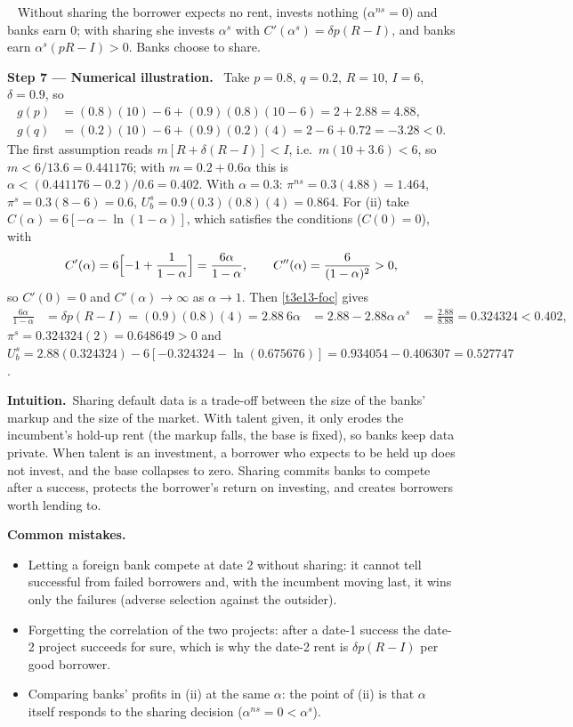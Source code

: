 \documentclass[11pt,a4paper]{article}
\newcommand{\step}[2]{\par\medskip\noindent\textbf{Step #1 --- #2.}~}
\newcommand{\intuition}{\par\medskip\noindent\textbf{Intuition.}~}
\newcommand{\answer}[1]{\par\smallskip\noindent\fbox{\textbf{Answer #1.}}~}
\newcommand{\pitfalls}{\par\medskip\noindent\textbf{Common mistakes.}}
\begin{document}
\answer{(ii)} Without sharing the borrower expects no rent, invests nothing ($\alpha^{ns}=0$) and banks earn $0$; with sharing she invests $\alpha^s$ with $C'(\alpha^s)=\delta p(R-I)$, and banks earn $\alpha^s(pR-I)>0$. Banks choose to share.

\step{7}{Numerical illustration} Take $p=0.8$, $q=0.2$, $R=10$, $I=6$, $\delta=0.9$, so
\begin{align}
  g(p) &= (0.8)(10)-6+(0.9)(0.8)(10-6) = 2+2.88 = 4.88, \nonumber\\
  g(q) &= (0.2)(10)-6+(0.9)(0.2)(4) = 2-6+0.72 = -3.28<0. \nonumber
\end{align}
The first assumption reads $m[R+\delta(R-I)]<I$, i.e.\ $m(10+3.6)<6$, so $m<6/13.6=0.441176$; with $m=0.2+0.6\alpha$ this is $\alpha<(0.441176-0.2)/0.6=0.402$. With
$\alpha=0.3$: $\pi^{ns}=0.3(4.88)=1.464$, $\pi^s=0.3(8-6)=0.6$, $U_b^s=0.9(0.3)(0.8)(4)=0.864$. For (ii) take
$C(\alpha)=6[-\alpha-\ln(1-\alpha)]$, which satisfies the conditions ($C(0)=0$), with
\begin{align}
  C'(\alpha)=6\Bigl[-1+\frac{1}{1-\alpha}\Bigr]=\frac{6\alpha}{1-\alpha}, \qquad C''(\alpha)=\frac{6}{(1-\alpha)^2}>0, \nonumber
\end{align}
so $C'(0)=0$ and $C'(\alpha)\to\infty$ as $\alpha\to1$.
Then \eqref{t3e13-foc} gives
\begin{align}
  \frac{6\alpha}{1-\alpha}&=\delta p(R-I)=(0.9)(0.8)(4)=2.88 \nonumber\
  6\alpha&=2.88-2.88\alpha \nonumber\
  \alpha^s&=\frac{2.88}{8.88}=0.324324<0.402, \nonumber
\end{align}
$\pi^s=0.324324(2)=0.648649>0$ and $U_b^s=2.88(0.324324)-6[-0.324324-\ln(0.675676)]=0.934054-0.406307=0.527747$.

\intuition Sharing default data is a trade-off between the size of the banks' markup and the size of the
market. With talent given, it only erodes the incumbent's hold-up rent (the markup falls, the base is
fixed), so banks keep data private. When talent is an investment, a borrower who expects to be held up
does not invest, and the base collapses to zero. Sharing commits banks to compete after a success,
protects the borrower's return on investing, and creates borrowers worth lending to.

\pitfalls
\begin{itemize}
  \item Letting a foreign bank compete at date 2 without sharing: it cannot tell successful from failed borrowers and, with the incumbent moving last, it wins only the failures (adverse selection against the outsider).
  \item Forgetting the correlation of the two projects: after a date-1 success the date-2 project succeeds for sure, which is why the date-2 rent is $\delta p(R-I)$ per good borrower.
  \item Comparing banks' profits in (ii) at the same $\alpha$: the point of (ii) is that $\alpha$ itself responds to the sharing decision ($\alpha^{ns}=0<\alpha^s$).
\end{itemize}
\end{document}
